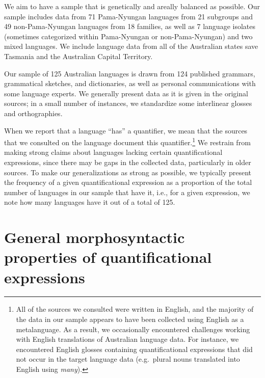 \documentclass[12pt,egregdoesnotlikesansseriftitles]{scrartcl}
\begin{document}
We aim to have a sample that is genetically and areally balanced as possible. Our sample includes data from 71 Pama-Nyungan languages from 21 subgroups and 49 non-Pama-Nyungan languages from 18 families, as well as 7 language isolates (sometimes categorized within Pama-Nyungan or non-Pama-Nyungan) and two mixed languages. We include language data from all of the Australian states save Tasmania and the Australian Capital Territory.

Our sample of 125 Australian languages  is drawn from 124 published grammars, grammatical sketches, and dictionaries, as well as personal communications with some language experts.  We generally present data as it is given in the original sources; in a small number of  instances, we standardize some interlinear glosses and orthographies.

When we report that a language ``has'' a quantifier, we mean that the sources that we consulted on the language document this quantifier.\footnote{All of the sources we consulted were written in English, and the majority of the data in our sample appears to have been collected using English as a metalanguage. As a result, we occasionally encountered challenges working with English translations of Australian language data. For instance, we  encountered English glosses containing quantificational expressions that did not occur in the target language data (e.g.\ plural nouns translated into English using \textit{many}).} We restrain from making strong claims about languages lacking certain quantificational
expressions, since there may be gaps in the collected data, particularly in older sources. To make our generalizations as strong as possible, we typically present the frequency of a given quantificational expression as a proportion of the total number of languages in our sample that have it, i.e., for a given expression, we note how many languages have it out of a total of 125.




\section{General morphosyntactic properties of  quantificational expressions}


\end{document}
